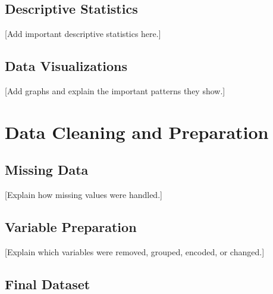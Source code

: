 \documentclass[conference]{IEEEtran}
\begin{document}

\subsection{Descriptive Statistics}

[Add important descriptive statistics here.]


\subsection{Data Visualizations}


[Add graphs and explain the important patterns they show.]


\section{Data Cleaning and Preparation}


\subsection{Missing Data}

[Explain how missing values were handled.]


\subsection{Variable Preparation}

[Explain which variables were removed, grouped, encoded, or changed.]


\subsection{Final Dataset}
\end{document}
